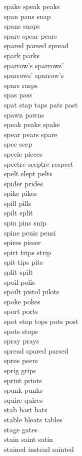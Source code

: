 spake speak peaks\\
span pans snap\\
spans snaps\\
spare spear pears\\
spared parsed spread\\
spark parks\\
sparrow's sparrows'\\
sparrows' sparrow's\\
spars rasps\\
spas pass\\
spat stap taps pats past\\
spawn pawns\\
speak peaks spake\\
spear pears spare\\
spec scep\\
specie pieces\\
spectre sceptre respect\\
spelt slept pelts\\
spider prides\\
spike pikes\\
spill pills\\
spilt split\\
spin pins snip\\
spine penis pensi\\
spires pisser\\
spirt trips strip\\
spit tips pits\\
split spilt\\
spoil polis\\
spoilt pistol pilots\\
spoke pokes\\
sport ports\\
spot stop tops pots post\\
spots stops\\
spray prays\\
spread spared parsed\\
spree peers\\
sprig grips\\
sprint prints\\
spunk punks\\
squire quires\\
stab bast bats\\
stable bleats tables\\
stage gates\\
stain saint satin\\
stained instead sainted\\
